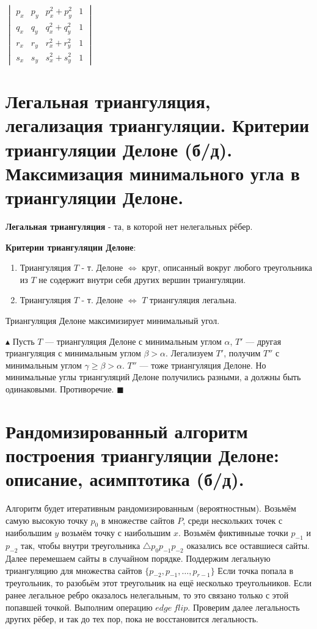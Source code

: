\begin{center}
    $\begin{vmatrix} p_x & p_y & p_x^2 + p_y^2 & 1 \\ q_x & q_y & q_x^2 + q_y^2 & 1 \\ r_x & r_y & r_x^2 + r_y^2 & 1 \\ s_x & s_y & s_x^2 + s_y^2 & 1 \end{vmatrix}$
\end{center}

\section{Легальная триангуляция, легализация триангуляции. Критерии триангуляции Делоне (б/д). Максимизация минимального угла в триангуляции Делоне.}
\textbf{Легальная триангуляция} - та, в которой нет нелегальных рёбер.

\textbf{Критерии триангуляции Делоне}:
\begin{enumerate}
    \item Триангуляция $T$ - т. Делоне $\Leftrightarrow$ круг, описанный вокруг любого треугольника из $T$ не содержит внутри себя других вершин триангуляции.
    \item  Триангуляция $T$ - т. Делоне $\Leftrightarrow$ $T$ триангуляция легальна.
\end{enumerate}

Триангуляция Делоне максимизирует минимальный угол.

$\blacktriangle$ Пусть $T$ — триангуляция Делоне с минимальным углом $\alpha$, $T'$ — другая триангуляция с минимальным углом $\beta > \alpha$. Легализуем $T'$, получим $T''$ с минимальным углом $\gamma \geqslant \beta > \alpha$. $T''$ — тоже триангуляция Делоне. Но минимальные углы триангуляций Делоне получились разными, а должны быть одинаковыми. Противоречие. $\blacksquare$

\newpage{}

\section{Рандомизированный алгоритм построения триангуляции Делоне: описание, асимптотика (б/д).}

Алгоритм будет итеративным рандомизированным (вероятностным). Возьмём самую высокую точку $p_0$ в множестве сайтов $P$, среди нескольких точек с наибольшим $y$ возьмём точку с наибольшим $x$. Возьмём фиктивныые точки $p_{-1}$ и $p_{-2}$ так, чтобы внутри треугольника $\triangle p_0 p_{-1} p_{-2}$ оказались все оставшиеся сайты. Далее перемешаем сайты в случайном порядке. Поддержим легальную триангуляцию для множества сайтов $\{ p_{-2}, p_{-1}, \dots, p_{r - 1} \}$ Если точка попала в треугольник, то разобьём этот треугольник на ещё несколько треугольников. Если ранее легальное ребро оказалось нелегальным, то это связано только с этой попавшей точкой. Выполним операцию $edge \ flip$. Проверим далее легальность других рёбер, и так до тех пор, пока не восстановится легальность.

